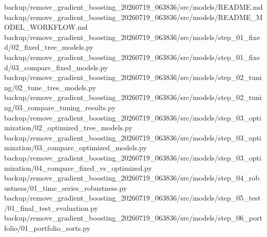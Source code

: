 \documentclass[
  11pt,
  a4paper]{article}
\newenvironment{Shaded}{}{}
\newcommand{\NormalTok}[1]{#1}
\begin{document}
\begin{Shaded}
\begin{Highlighting}[]
\NormalTok{backup/remove\_\allowbreak{}gradient\_\allowbreak{}boosting\_\allowbreak{}20260719\_\allowbreak{}063836/src/models/README.md}
\NormalTok{backup/remove\_\allowbreak{}gradient\_\allowbreak{}boosting\_\allowbreak{}20260719\_\allowbreak{}063836/src/models/README\_\allowbreak{}MODEL\_\allowbreak{}WORKFLOW.md}
\NormalTok{backup/remove\_\allowbreak{}gradient\_\allowbreak{}boosting\_\allowbreak{}20260719\_\allowbreak{}063836/src/models/step\_\allowbreak{}01\_\allowbreak{}fixed/02\_\allowbreak{}fixed\_\allowbreak{}tree\_\allowbreak{}models.py}
\NormalTok{backup/remove\_\allowbreak{}gradient\_\allowbreak{}boosting\_\allowbreak{}20260719\_\allowbreak{}063836/src/models/step\_\allowbreak{}01\_\allowbreak{}fixed/03\_\allowbreak{}compare\_\allowbreak{}fixed\_\allowbreak{}models.py}
\NormalTok{backup/remove\_\allowbreak{}gradient\_\allowbreak{}boosting\_\allowbreak{}20260719\_\allowbreak{}063836/src/models/step\_\allowbreak{}02\_\allowbreak{}tuning/02\_\allowbreak{}tune\_\allowbreak{}tree\_\allowbreak{}models.py}
\NormalTok{backup/remove\_\allowbreak{}gradient\_\allowbreak{}boosting\_\allowbreak{}20260719\_\allowbreak{}063836/src/models/step\_\allowbreak{}02\_\allowbreak{}tuning/03\_\allowbreak{}compare\_\allowbreak{}tuning\_\allowbreak{}results.py}
\NormalTok{backup/remove\_\allowbreak{}gradient\_\allowbreak{}boosting\_\allowbreak{}20260719\_\allowbreak{}063836/src/models/step\_\allowbreak{}03\_\allowbreak{}optimization/02\_\allowbreak{}optimized\_\allowbreak{}tree\_\allowbreak{}models.py}
\NormalTok{backup/remove\_\allowbreak{}gradient\_\allowbreak{}boosting\_\allowbreak{}20260719\_\allowbreak{}063836/src/models/step\_\allowbreak{}03\_\allowbreak{}optimization/03\_\allowbreak{}compare\_\allowbreak{}optimized\_\allowbreak{}models.py}
\NormalTok{backup/remove\_\allowbreak{}gradient\_\allowbreak{}boosting\_\allowbreak{}20260719\_\allowbreak{}063836/src/models/step\_\allowbreak{}03\_\allowbreak{}optimization/04\_\allowbreak{}compare\_\allowbreak{}fixed\_\allowbreak{}vs\_\allowbreak{}optimized.py}
\NormalTok{backup/remove\_\allowbreak{}gradient\_\allowbreak{}boosting\_\allowbreak{}20260719\_\allowbreak{}063836/src/models/step\_\allowbreak{}04\_\allowbreak{}robustness/01\_\allowbreak{}time\_\allowbreak{}series\_\allowbreak{}robustness.py}
\NormalTok{backup/remove\_\allowbreak{}gradient\_\allowbreak{}boosting\_\allowbreak{}20260719\_\allowbreak{}063836/src/models/step\_\allowbreak{}05\_\allowbreak{}test/01\_\allowbreak{}final\_\allowbreak{}test\_\allowbreak{}evaluation.py}
\NormalTok{backup/remove\_\allowbreak{}gradient\_\allowbreak{}boosting\_\allowbreak{}20260719\_\allowbreak{}063836/src/models/step\_\allowbreak{}06\_\allowbreak{}portfolio/01\_\allowbreak{}portfolio\_\allowbreak{}sorts.py}

\end{Highlighting}
\end{Shaded}
\end{document}
